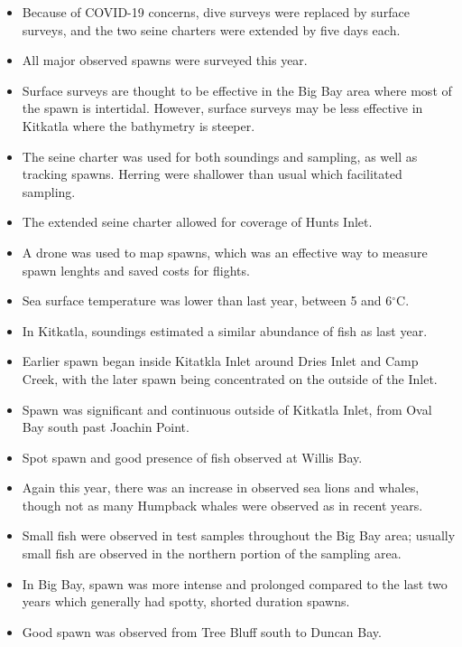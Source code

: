 \begin{itemize}

\item Because of COVID-19 concerns, dive surveys were replaced by surface surveys, and the two seine charters were extended by five days each.

\item All major observed spawns were surveyed this year.

\item Surface surveys are thought to be effective in the Big Bay area where most of the spawn is intertidal.
However, surface surveys may be less effective in Kitkatla where the bathymetry is steeper.

\item The seine charter was used for both soundings and sampling, as well as tracking spawns.
Herring were shallower than usual which facilitated sampling.

\item The extended seine charter allowed for coverage of Hunts Inlet.

\item A drone was used to map spawns, which was an effective way to measure spawn lenghts and saved costs for flights.

\item Sea surface temperature was lower than last year, between 5 and 6$^\circ\text{C}$.

\item In Kitkatla, soundings estimated a similar abundance of fish as last year.

\item Earlier spawn began inside Kitatkla Inlet around Dries Inlet and Camp Creek, with the later spawn being concentrated on the outside of the Inlet.

\item Spawn was significant and continuous outside of Kitkatla Inlet, from Oval Bay south past Joachin Point.

\item Spot spawn and good presence of fish observed at Willis Bay.

\item Again this year, there was an increase in observed sea lions and whales, though not as many Humpback whales were observed as in recent years.

\item Small fish were observed in test samples throughout the Big Bay area;
usually small fish are observed in the northern portion of the sampling area.

\item In Big Bay, spawn was more intense and prolonged compared to the last two years which generally had spotty, shorted duration spawns.

\item Good spawn was observed from Tree Bluff south to Duncan Bay.

\end{itemize}
